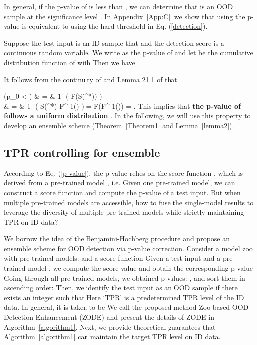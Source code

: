 \documentclass{article} \usepackage{iclr2023_conference,times}
\def\rvx{{\mathbf{x}}}
\def\sP{{\mathbb{P}}}
\newcommand{\benrr}{}
\begin{document}
In general, if the p-value of  is less than , we can determine that  is an OOD sample at the significance level . In Appendix~\ref{App:C}, we show that using the p-value is equivalent to using the hard threshold  in Eq. (\ref{detection}).


Suppose the test input  is an ID sample that  and the detection score  is a continuous random variable. 
We write  as the p-value of  and let  be the cumulative distribution function of  with 
Then we have

It follows from the continuity of  and Lemma 21.1 of \cite{van2000asymptotic} that
\benrr
\sP(p_0 < \alpha) & = & 1- \sP\big( F(S(\rvx^{*})) \geq \alpha \big) \\
    & = & 1- \sP\big( S(\rvx^{*}) \geq F^{-1}(\alpha) \big) = F(F^{-1}(\alpha)) = \alpha. 
\eenrr
This implies that {\bf the p-value of  follows a uniform distribution }.
In the following, we will use this property to develop an ensemble scheme (Theorem~\ref{Theorem1} and Lemma~\ref{lemma2}). 

\subsection{TPR controlling for ensemble}

According to Eq. (\ref{p-value}), the p-value relies on the score function , which is derived from a pre-trained model , i.e.  
Given one pre-trained model, we can construct a score function and compute the p-value of a test input.
But when multiple pre-trained models are accessible, how to fuse the single-model results to leverage the diversity of multiple pre-trained models while strictly maintaining TPR on ID data?

We borrow the idea of the Benjamini-Hochberg procedure \citep{benjamini1995controlling} and propose an ensemble scheme for OOD detection via p-value correction. 
Consider a model zoo with  pre-trained models:  and a score function 
Given a test input  and a pre-trained model , we compute the score value  and obtain the corresponding p-value 
Going through all pre-trained models, we obtained  p-values: , and sort them in ascending order:  
Then, we identify the test input  as an OOD sample if there exists an integer  such that  Here ‘TPR’ is a predetermined TPR level of the ID data. In general, it is taken to be  
We call the proposed method Zoo-based OOD Detection Enhancement (ZODE) and present the details of ZODE in Algorithm~\ref{algorithm1}.
Next, we provide theoretical guarantees that Algorithm~\ref{algorithm1} can maintain the target TPR level on ID data.
\end{document}
